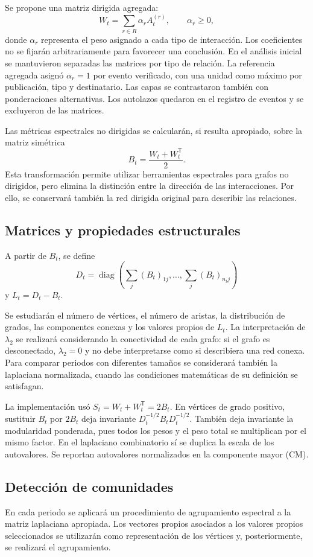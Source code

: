 \documentclass[journal]{IEEEtran}
\begin{document}
Se propone una matriz dirigida agregada:
\[
W_t=\sum_{r\in R}\alpha_r A^{(r)}_t,\qquad \alpha_r\ge 0,
\]
donde $\alpha_r$ representa el peso asignado a cada tipo de interacción. Los coeficientes no se fijarán arbitrariamente para favorecer una conclusión. En el análisis inicial se mantuvieron separadas las matrices por tipo de relación. La referencia agregada asignó $\alpha_r=1$ por evento verificado, con una unidad como máximo por publicación, tipo y destinatario. Las capas se contrastaron también con ponderaciones alternativas. Los autolazos quedaron en el registro de eventos y se excluyeron de las matrices.

Las métricas espectrales no dirigidas se calcularán, si resulta apropiado, sobre la matriz simétrica
\[
B_t=\frac{W_t+W_t^{\mathsf T}}{2}.
\]
Esta transformación permite utilizar herramientas espectrales para grafos no dirigidos, pero elimina la distinción entre la dirección de las interacciones. Por ello, se conservará también la red dirigida original para describir las relaciones.

\subsection{Matrices y propiedades estructurales}
A partir de $B_t$, se define
\[
D_t=\operatorname{diag}\left(\sum_j (B_t)_{1j},\ldots,\sum_j (B_t)_{n_tj}\right)
\]
y $L_t=D_t-B_t$.

Se estudiarán el número de vértices, el número de aristas, la distribución de grados, las componentes conexas y los valores propios de $L_t$. La interpretación de $\lambda_2$ se realizará considerando la conectividad de cada grafo: si el grafo es desconectado, $\lambda_2=0$ y no debe interpretarse como si describiera una red conexa. Para comparar periodos con diferentes tamaños se considerará también la laplaciana normalizada, cuando las condiciones matemáticas de su definición se satisfagan.

La implementación usó $S_t=W_t+W_t^{\mathsf T}=2B_t$. En vértices de grado positivo, sustituir $B_t$ por $2B_t$ deja invariante $D_t^{-1/2}B_tD_t^{-1/2}$. También deja invariante la modularidad ponderada, pues todos los pesos y el peso total se multiplican por el mismo factor. En el laplaciano combinatorio sí se duplica la escala de los autovalores. Se reportan autovalores normalizados en la componente mayor (CM).

\subsection{Detección de comunidades}
En cada periodo se aplicará un procedimiento de agrupamiento espectral a la matriz laplaciana apropiada. Los vectores propios asociados a los valores propios seleccionados se utilizarán como representación de los vértices y, posteriormente, se realizará el agrupamiento.
\end{document}
